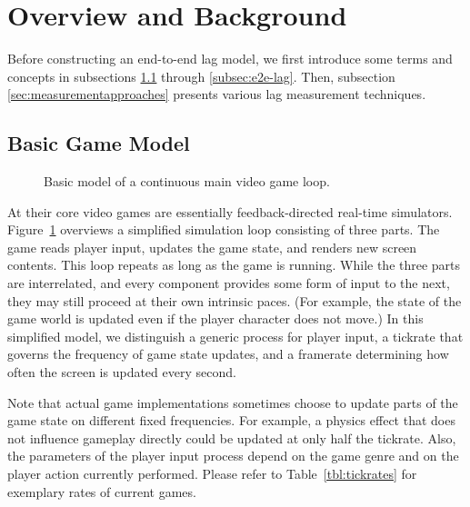 \section{Overview and Background}
\label{sec:background}

Before constructing an end-to-end lag model, we first introduce some terms 
and concepts in subsections \ref{subsec:game-model} through 
\ref{subsec:e2e-lag}. Then, subsection \ref{sec:measurementapproaches} 
presents various lag measurement techniques.


\subsection{Basic Game Model}
\label{subsec:game-model}

\begin{figure}[!t]
\centering
\removelatexerror
\begin{algorithm}[H]
\end{algorithm}
\caption{Basic model of a continuous main video game loop.}
\label{alg:gameloop1}
\end{figure}

At their core video games are essentially feedback-directed 
real-time simulators. Figure~\ref{alg:gameloop1} overviews a 
simplified simulation loop consisting of three parts.
The game reads player input, updates the game state, and renders 
new screen contents. This loop repeats as long as the game is running. 
While the three parts are interrelated, and every component provides 
some form of input to the next, they may still proceed at their own 
intrinsic paces. (For example, the state of the game world is updated 
even if the player character does not move.)
In this simplified model, we distinguish a generic process for player 
input, a tickrate that governs the frequency of game state updates, and 
a framerate determining how often the screen is updated every second.

Note that actual game implementations sometimes choose to update 
parts of the game state on different fixed frequencies. For example, 
a physics effect that does not influence gameplay directly could be 
updated at only half the tickrate. Also, the parameters of the player 
input process depend on the game genre and on the player action 
currently performed. Please refer to Table~\ref{tbl:tickrates} for 
exemplary rates of current games.

